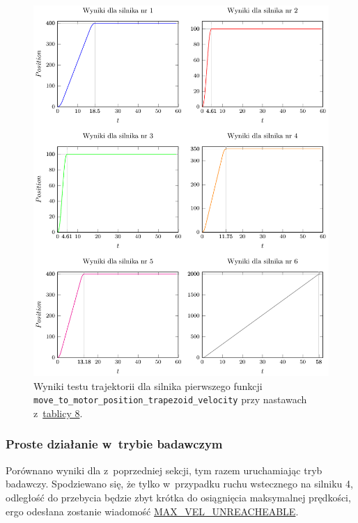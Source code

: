 \documentclass[a4paper, 12pt]{article}
\begin{document}
	\begin{figure}[H]
		\centering
		\includegraphics[scale=1.1]{raport_graphs/simpMPVall.pdf}
		\caption{Wyniki testu trajektorii dla silnika pierwszego funkcji \texttt{move\_to\_motor\_position\_trapezoid\_velocity} przy nastawach z~\hyperref[tab:setup1]{tablicy 8}.}
		\label{fig:simpMPVall}
	\end{figure}
		
	\newpage
	\subsubsection{Proste działanie w~trybie badawczym}
	\label{sec:MPVR}
	Porównano wyniki dla z~poprzedniej sekcji, tym razem uruchamiając tryb badawczy. Spodziewano się, że tylko w~przypadku ruchu wstecznego na silniku 4, odległość do przebycia będzie zbyt krótka do osiągnięcia maksymalnej prędkości, ergo odesłana zostanie wiadomość \hyperref[tab:resultcodes]{MAX\_VEL\_UNREACHEABLE}.
	
\end{document}
